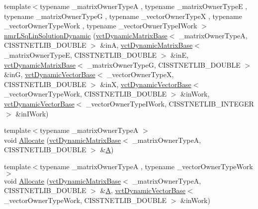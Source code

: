 \begin{DoxyCompactItemize}
\item 
{\footnotesize template$<$typename \-\_\-matrix\-Owner\-Type\-A , typename \-\_\-matrix\-Owner\-Type\-E , typename \-\_\-matrix\-Owner\-Type\-G , typename \-\_\-vector\-Owner\-Type\-X , typename \-\_\-vector\-Owner\-Type\-Work , typename \-\_\-vector\-Owner\-Type\-I\-Work $>$ }\\\hyperlink{classnmr_l_sq_lin_solution_dynamic_a282557f13b6bc5752d1d9bd5856f0747}{nmr\-L\-Sq\-Lin\-Solution\-Dynamic} (\hyperlink{classvct_dynamic_matrix_base}{vct\-Dynamic\-Matrix\-Base}$<$ \-\_\-matrix\-Owner\-Type\-A, C\-I\-S\-S\-T\-N\-E\-T\-L\-I\-B\-\_\-\-D\-O\-U\-B\-L\-E $>$ \&in\-A, \hyperlink{classvct_dynamic_matrix_base}{vct\-Dynamic\-Matrix\-Base}$<$ \-\_\-matrix\-Owner\-Type\-E, C\-I\-S\-S\-T\-N\-E\-T\-L\-I\-B\-\_\-\-D\-O\-U\-B\-L\-E $>$ \&in\-E, \hyperlink{classvct_dynamic_matrix_base}{vct\-Dynamic\-Matrix\-Base}$<$ \-\_\-matrix\-Owner\-Type\-G, C\-I\-S\-S\-T\-N\-E\-T\-L\-I\-B\-\_\-\-D\-O\-U\-B\-L\-E $>$ \&in\-G, \hyperlink{classvct_dynamic_vector_base}{vct\-Dynamic\-Vector\-Base}$<$ \-\_\-vector\-Owner\-Type\-X, C\-I\-S\-S\-T\-N\-E\-T\-L\-I\-B\-\_\-\-D\-O\-U\-B\-L\-E $>$ \&in\-X, \hyperlink{classvct_dynamic_vector_base}{vct\-Dynamic\-Vector\-Base}$<$ \-\_\-vector\-Owner\-Type\-Work, C\-I\-S\-S\-T\-N\-E\-T\-L\-I\-B\-\_\-\-D\-O\-U\-B\-L\-E $>$ \&in\-Work, \hyperlink{classvct_dynamic_vector_base}{vct\-Dynamic\-Vector\-Base}$<$ \-\_\-vector\-Owner\-Type\-I\-Work, C\-I\-S\-S\-T\-N\-E\-T\-L\-I\-B\-\_\-\-I\-N\-T\-E\-G\-E\-R $>$ \&in\-I\-Work)
\item 
{\footnotesize template$<$typename \-\_\-matrix\-Owner\-Type\-A $>$ }\\void \hyperlink{classnmr_l_sq_lin_solution_dynamic_a1b78d0a3a3131dd1d50290bf4987bb18}{Allocate} (\hyperlink{classvct_dynamic_matrix_base}{vct\-Dynamic\-Matrix\-Base}$<$ \-\_\-matrix\-Owner\-Type\-A, C\-I\-S\-S\-T\-N\-E\-T\-L\-I\-B\-\_\-\-D\-O\-U\-B\-L\-E $>$ \&\hyperlink{classnmr_l_sq_lin_solution_dynamic_aa4a41abac141e2e55dd5cafb59169dfd}{A})
\item 
{\footnotesize template$<$typename \-\_\-matrix\-Owner\-Type\-A , typename \-\_\-vector\-Owner\-Type\-Work $>$ }\\void \hyperlink{classnmr_l_sq_lin_solution_dynamic_a60f10aa3af469edc673ef555889a959c}{Allocate} (\hyperlink{classvct_dynamic_matrix_base}{vct\-Dynamic\-Matrix\-Base}$<$ \-\_\-matrix\-Owner\-Type\-A, C\-I\-S\-S\-T\-N\-E\-T\-L\-I\-B\-\_\-\-D\-O\-U\-B\-L\-E $>$ \&\hyperlink{classnmr_l_sq_lin_solution_dynamic_aa4a41abac141e2e55dd5cafb59169dfd}{A}, \hyperlink{classvct_dynamic_vector_base}{vct\-Dynamic\-Vector\-Base}$<$ \-\_\-vector\-Owner\-Type\-Work, C\-I\-S\-S\-T\-N\-E\-T\-L\-I\-B\-\_\-\-D\-O\-U\-B\-L\-E $>$ \&in\-Work)

\end{DoxyCompactItemize}
